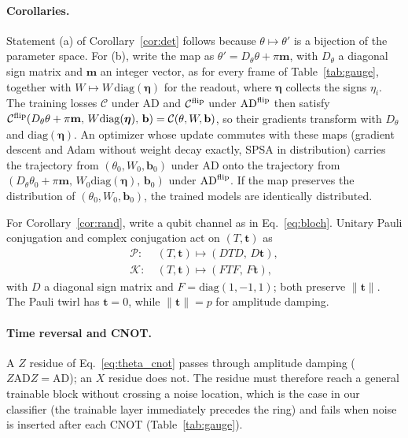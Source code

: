 \documentclass[
 aps,pra,
 twocolumn,
 superscriptaddress,
 longbibliography,
 nofootinbib
]{revtex4-2}
\newcommand{\AD}{\mathrm{AD}}
\begin{document}
\paragraph{Corollaries.}
Statement (a) of Corollary~\ref{cor:det} follows because $\theta\mapsto\theta'$ is a
bijection of the parameter space. For (b), write the map as
$\theta'=D_\theta\theta+\pi\mathbf m$, with $D_\theta$ a diagonal sign matrix and
$\mathbf m$ an integer vector, as for every frame of Table~\ref{tab:gauge},
together with $W\mapsto W\,\mathrm{diag}(\boldsymbol\eta)$ for the readout, where
$\boldsymbol\eta$ collects the signs $\eta_i$. The training losses $\mathcal C$
under $\AD$ and $\mathcal C^{\rm flip}$ under $\AD^{\rm flip}$ then satisfy
$\mathcal C^{\rm flip}(D_\theta\theta+\pi\mathbf m,\,W\mathrm{diag}(\boldsymbol\eta),\,\mathbf b)=\mathcal C(\theta,W,\mathbf b)$,
so their gradients transform with $D_\theta$ and $\mathrm{diag}(\boldsymbol\eta)$.
An optimizer whose update commutes with these maps (gradient descent and Adam
without weight decay exactly, SPSA in distribution) carries the trajectory from
$(\theta_0,W_0,\mathbf b_0)$ under $\AD$ onto the trajectory from
$(D_\theta\theta_0+\pi\mathbf m,\,W_0\mathrm{diag}(\boldsymbol\eta),\,\mathbf b_0)$
under $\AD^{\rm flip}$. If the map preserves the distribution of
$(\theta_0,W_0,\mathbf b_0)$, the trained models are identically distributed.

For Corollary~\ref{cor:rand}, write a qubit channel as in Eq.~\eqref{eq:bloch}.
Unitary Pauli conjugation and complex conjugation act on $(T,\mathbf t)$ as
\begin{align}
\mathcal P\colon&\ (T,\mathbf t)\mapsto(DTD,\,D\mathbf t),
\label{eq:app_D}\\
\mathcal K\colon&\ (T,\mathbf t)\mapsto(FTF,\,F\mathbf t),
\label{eq:app_F}
\end{align}
with $D$ a diagonal sign matrix and $F=\mathrm{diag}(1,-1,1)$; both preserve
$\lVert\mathbf t\rVert$. The Pauli twirl has $\mathbf t=0$, while
$\lVert\mathbf t\rVert=p$ for amplitude damping.

\paragraph{Time reversal and CNOT.}
A $Z$ residue of Eq.~\eqref{eq:theta_cnot}
passes through amplitude damping ($Z\AD Z=\AD$); an $X$ residue does not. The residue must
therefore reach a general trainable block without crossing a noise location, which is the
case in our classifier (the trainable layer immediately precedes the ring) and fails when
noise is inserted after each CNOT (Table~\ref{tab:gauge}).
\end{document}
